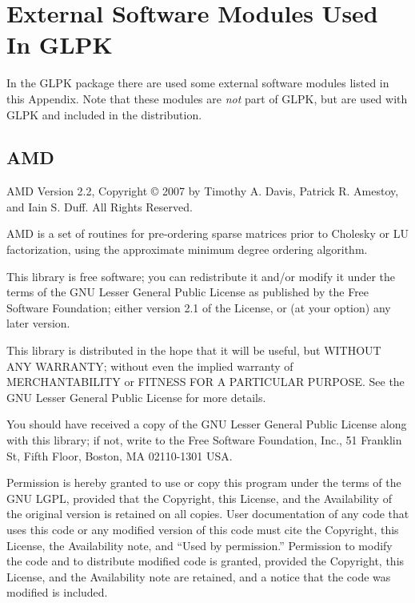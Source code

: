 
\chapter{External Software Modules Used In GLPK}

In the GLPK package there are used some external software modules
listed in this Appendix. Note that these modules are {\it not} part of
GLPK, but are used with GLPK and included in the distribution.


\section{AMD}

\noindent
AMD Version 2.2, Copyright {\copyright} 2007 by Timothy A. Davis,
Patrick R. Amestoy, and Iain S. Duff.  All Rights Reserved.


AMD is a set of routines for pre-ordering sparse matrices prior to
Cholesky or LU factorization, using the approximate minimum degree
ordering algorithm.


This library is free software; you can redistribute it and/or
modify it under the terms of the GNU Lesser General Public License
as published by the Free Software Foundation; either version 2.1 of
the License, or (at your option) any later version.

This library is distributed in the hope that it will be useful,
but WITHOUT ANY WARRANTY; without even the implied warranty of
MERCHANTABILITY or FITNESS FOR A PARTICULAR PURPOSE.  See the GNU
Lesser General Public License for more details.

You should have received a copy of the GNU Lesser General Public
License along with this library; if not, write to the Free Software
Foundation, Inc., 51 Franklin St, Fifth Floor, Boston, MA 02110-1301
USA.

Permission is hereby granted to use or copy this program under the
terms of the GNU LGPL, provided that the Copyright, this License,
and the Availability of the original version is retained on all
copies.  User documentation of any code that uses this code or any
modified version of this code must cite the Copyright, this License,
the Availability note, and ``Used by permission.''  Permission to
modify the code and to distribute modified code is granted, provided
the Copyright, this License, and the Availability note are retained,
and a notice that the code was modified is included.

